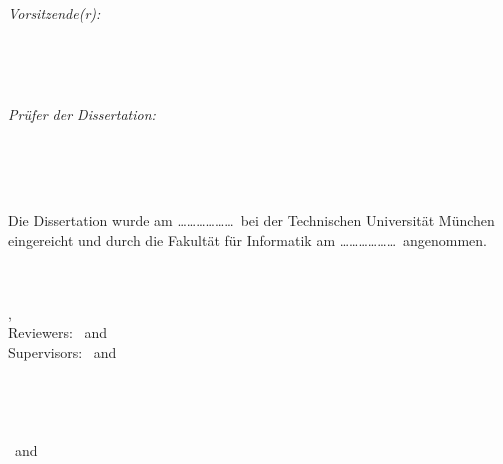 \begin{titlepage}
	\begin{minipage}[t]{.32\textwidth}
		\raggedleft
		\textit{Vorsitzende(r):}
	\end{minipage}
	\hspace*{15pt}
	\begin{minipage}[t]{.6\textwidth}
		{\Large \thesisVorsitzender} \\
		{\small \thesisVorsitzenderAffiliation}
	\end{minipage} \\[5mm]
	\begin{minipage}[t]{.32\textwidth}
		\raggedleft
		\textit{Prüfer der Dissertation:}
	\end{minipage}
	\hspace*{15pt}
	\begin{minipage}[t]{.6\textwidth}
		{\Large \thesisFirstReviewer} \\
		{\small \thesisFirstReviewerAffiliation}  \\[10pt]
		{\Large \thesisSecondReviewer} \\
		{\small \thesisSecondReviewerAffiliation}
	\end{minipage}
	
	\vspace{1cm}
	
	\begin{minipage}[t]{.95\textwidth}
		Die Dissertation wurde am \dots\dots\dots\dots\dots\dots ~bei der Technischen Universität München eingereicht und durch die Fakultät für Informatik am \dots\dots\dots\dots\dots\dots ~angenommen.
	\end{minipage}

\end{titlepage}

\hfill
\vfill
{
	\small
	\textbf{\thesisName} \\
	\textit{\thesisTitle} \\
	\thesisSubject, \thesisDate \\
	Reviewers: \thesisFirstReviewer\ and \thesisSecondReviewer \\
	Supervisors: \thesisFirstSupervisor\ and \thesisSecondSupervisor \\[1.5em]
	\textbf{\thesisUniversity} \\
	\thesisUniversityDepartment \\
	\thesisUniversityInstitute \\
	\thesisUniversityStreetAddress \\
	\thesisUniversityPostalCode\ and \thesisUniversityCity
}
